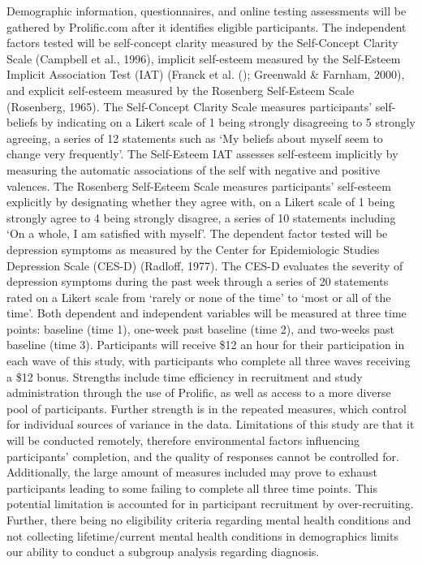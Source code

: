 \documentclass[
  man,
  longtable,
  nolmodern,
  notxfonts,
  notimes,
  colorlinks=true,linkcolor=blue,citecolor=blue,urlcolor=blue]{apa7}
\begin{document}
Demographic information, questionnaires, and online testing assessments
will be gathered by Prolific.com after it identifies eligible
participants. The independent factors tested will be self-concept
clarity measured by the Self-Concept Clarity Scale (Campbell et al.,
1996), implicit self-esteem measured by the Self-Esteem Implicit
Association Test (IAT) (Franck et al.
(); Greenwald \& Farnham,
2000), and explicit self-esteem measured by the Rosenberg Self-Esteem
Scale (Rosenberg, 1965). The Self-Concept Clarity Scale measures
participants' self-beliefs by indicating on a Likert scale of 1 being
strongly disagreeing to 5 strongly agreeing, a series of 12 statements
such as `My beliefs about myself seem to change very frequently'. The
Self-Esteem IAT assesses self-esteem implicitly by measuring the
automatic associations of the self with negative and positive valences.
The Rosenberg Self-Esteem Scale measures participants' self-esteem
explicitly by designating whether they agree with, on a Likert scale of
1 being strongly agree to 4 being strongly disagree, a series of 10
statements including `On a whole, I am satisfied with myself'. The
dependent factor tested will be depression symptoms as measured by the
Center for Epidemiologic Studies Depression Scale (CES-D) (Radloff,
1977). The CES-D evaluates the severity of depression symptoms during
the past week through a series of 20 statements rated on a Likert scale
from `rarely or none of the time' to `most or all of the time'. Both
dependent and independent variables will be measured at three time
points: baseline (time 1), one-week past baseline (time 2), and
two-weeks past baseline (time 3). Participants will receive \$12 an hour
for their participation in each wave of this study, with participants
who complete all three waves receiving a \$12 bonus. Strengths include
time efficiency in recruitment and study administration through the use
of Prolific, as well as access to a more diverse pool of participants.
Further strength is in the repeated measures, which control for
individual sources of variance in the data. Limitations of this study
are that it will be conducted remotely, therefore environmental factors
influencing participants' completion, and the quality of responses
cannot be controlled for. Additionally, the large amount of measures
included may prove to exhaust participants leading to some failing to
complete all three time points. This potential limitation is accounted
for in participant recruitment by over-recruiting. Further, there being
no eligibility criteria regarding mental health conditions and not
collecting lifetime/current mental health conditions in demographics
limits our ability to conduct a subgroup analysis regarding diagnosis.
\end{document}
